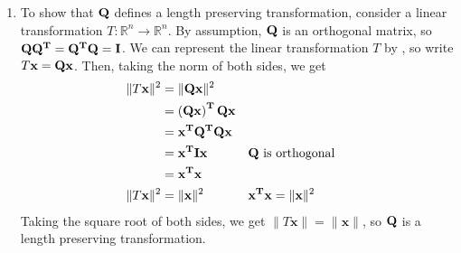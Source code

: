 \documentclass [12pt] {article}
\newcommand{\R}{\mathbb{R}}
\newcommand{\T}{\bf{T}}
\newcommand{\x}{\bf{x}}
\renewcommand{\bf}[1]{\textbf{{#1}}}
\begin{document}
\begin{enumerate}
\begin{enumerate}
\begin{enumerate}
                    \item To show that $\QQ$ defines a length preserving transformation, consider
                        a linear transformation $T : \R^n \to \R^n$. By assumption, $\QQ$ is an
                        orthogonal matrix, so $\QQ \QT = \QT \QQ = \bf{I}$. We can represent
                        the linear transformation $T$ by \QQ, so write $T \x = \QQ \x$. Then, 
                        taking the norm of both sides, we get
                        \begin{align*}
                            \|T \x\|^2 &= \|\QQ \x\|^2 \\
                                       &= \left( \QQ \x \right)^{\T} \QQ \x \\
                                       &= \x^{\T} \QT  \QQ \x \\ 
                                       &= \x^{\T} \bf{I} \x && \text{$\QQ$ is orthogonal} \\ 
                                       &= \x^{\T} \x \\ 
                            \|T \x\|^2 &= \|\x\|^2 && \x^{\T} \x = \|\x\|^2 \\
                        \end{align*}
                        Taking the square root of both sides, we get $\|T \x\| = \|\x\|$, so $\QQ$
                        is a length preserving transformation.
                \end{enumerate}
                

\end{enumerate}
\end{enumerate}
\end{document}
